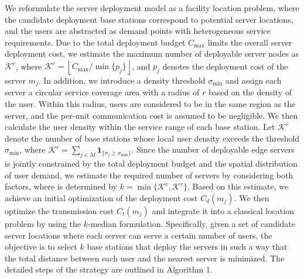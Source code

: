 \documentclass[10pt, conference, letterpaper]{IEEEtran}
\begin{document}
We reformulate the server deployment model as a facility location problem, where the candidate deployment base stations correspond to potential server locations, and the users are abstracted as demand points with heterogeneous service requirements. Due to the total deployment budget $C_{\max}$ limits the overall server deployment cost, we estimate the maximum number of deployable server nodes as $\mathcal{K}^c$, where $\mathcal{K}^c=\left\lfloor C_{\max}/\min\{p_j\}\right\rfloor$, and $p_j$ denotes the deployment cost of the server $m_j$. In addition, we introduce a density threshold $\sigma_{\min}$ and assign each server a circular service coverage area with a radius of $r$ based on the density of the user. Within this radius, users are considered to be in the same region as the server, and the per-unit communication cost is assumed to be negligible. We then calculate the user density within the service range of each base station. Let $\mathcal{K}^r$ denote the number of base stations whose local user density exceeds the threshold $\sigma_{\min}$, where $\mathcal{K}^{r}=\sum _{j\in M} \mathbf{1}_{\{\sigma_{j} \geq \sigma_{\min}\}}$. Since the number of deployable edge servers is jointly constrained by the total deployment budget and the spatial distribution of user demand, we estimate the required number of servers by considering both factors, where is determined by $k=\min\{\mathcal{K}^{c}, \mathcal{K}^{r}\}$. 
Based on this estimate, we achieve an initial optimization of the deployment cost $C_d(m_j)$. We then optimize the transmission cost $C_t(m_j)$ and integrate it into a classical location problem by using the $k$-median formulation. Specifically, given a set of candidate server locations where each server can serve a certain number of users, the objective is to select $k$ base stations that deploy the servers in such a way that the total distance between each user and the nearest server is minimized. The detailed steps of the strategy are outlined in Algorithm 1.
\end{document}
